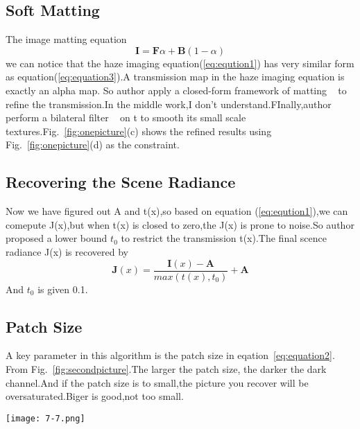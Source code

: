 \documentclass[10pt,twocolumn,letterpaper]{article}
\begin{document}
\subsection{Soft Matting}
The image matting equation 
\begin{equation}
\textbf{I} = \textbf{F}\alpha + \textbf{B}(1-\alpha)
\label{eq:equation3}
\end{equation}
we can notice that the haze imaging equation(\ref{eq:eqution1}) has very similar
form as equation(\ref{eq:equation3}).A transmission map in the haze imaging equation is exactly an alpha map. So author apply a closed-form framework of
matting ~\cite{Matting2006_1} to refine the transmission.In the middle work,I don't understand.FInally,author perform a bilateral filter ~\cite{Bilateral1998_2} on t to smooth its small scale textures.Fig.~\ref{fig:onepicture}(c) shows the refined results using Fig.~\ref{fig:onepicture}(d) as the
constraint.
\subsection{Recovering the Scene Radiance}
Now we have figured out A and t(x),so based on equation (\ref{eq:eqution1}),we can comepute J(x),but when t(x) is closed to zero,the J(x) is prone to noise.So author proposed a lower bound $t_{0}$ to restrict the transmission t(x).The final scence radiance J(x) is recovered by
\begin{equation}
\textbf{J}(x) = \frac{\textbf{I}(x) - \textbf{A}}{max(t(x),t_{0})} + \textbf{A}
\end{equation}
And $t_{0}$ is given 0.1.
\subsection{Patch Size}
A key parameter in this algorithm is the patch size in eqation~\ref{eq:equation2}.
From Fig.~\ref{fig:secondpicture}.The larger the patch size, the darker the dark channel.And if the patch size is to small,the picture you recover will be oversaturated.Biger is good,not too small.
\begin{figure*}[htb]
\centering
\texttt{[image: 7-7.png]}
\caption{A haze-free image ($600 \times 400$) and its dark channels using $3 \times 3$ and $15 \times 15$ patches, respectively.}
\label{fig:secondpicture}
\end{figure*}


{\small


}
\end{document}

